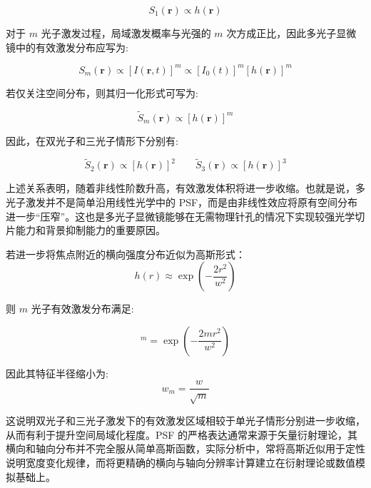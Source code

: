 \begin{equation}
  S_{1}(\mathbf{r})\propto h(\mathbf{r})
  \label{eq:linear_psf}
\end{equation}

对于 $m$ 光子激发过程，局域激发概率与光强的 $m$ 次方成正比，因此多光子显微镜中的有效激发分布应写为:

\begin{equation}
  S_{m}(\mathbf{r})\propto [I(\mathbf{r},t)]^{m}
  \propto [I_{0}(t)]^{m}[h(\mathbf{r})]^{m}
  \label{eq:multiphoton_psf}
\end{equation}

若仅关注空间分布，则其归一化形式可写为:

\begin{equation}
  \widetilde{S}_{m}(\mathbf{r})\propto [h(\mathbf{r})]^{m}
  \label{eq:effective_psf}
\end{equation}

因此，在双光子和三光子情形下分别有:

\begin{equation}
\widetilde{S}_{2}(\mathbf{r})\propto [h(\mathbf{r})]^2\qquad
\widetilde{S}_{3}(\mathbf{r})\propto [h(\mathbf{r})]^3
\end{equation}

上述关系表明，随着非线性阶数升高，有效激发体积将进一步收缩。也就是说，多光子激发并不是简单沿用线性光学中的 PSF，而是由非线性效应将原有空间分布进一步``压窄''。这也是多光子显微镜能够在无需物理针孔的情况下实现较强光学切片能力和背景抑制能力的重要原因。

若进一步将焦点附近的横向强度分布近似为高斯形式：
\begin{equation}
  h(r)\approx \exp\!\left(-\frac{2r^2}{w^2}\right)
  \label{eq:gaussian_psf}
\end{equation}

则 $m$ 光子有效激发分布满足:

\begin{equation}
  [h(r)]^m=\exp\!\left(-\frac{2mr^2}{w^2}\right)
\end{equation}

因此其特征半径缩小为:
\begin{equation}
  w_m=\frac{w}{\sqrt{m}}
  \label{eq:wm_scaling}
\end{equation}

这说明双光子和三光子激发下的有效激发区域相较于单光子情形分别进一步收缩，从而有利于提升空间局域化程度。PSF 的严格表达通常来源于矢量衍射理论，其横向和轴向分布并不完全服从简单高斯函数，实际分析中，常将高斯近似用于定性说明宽度变化规律，而将更精确的横向与轴向分辨率计算建立在衍射理论或数值模拟基础上。

